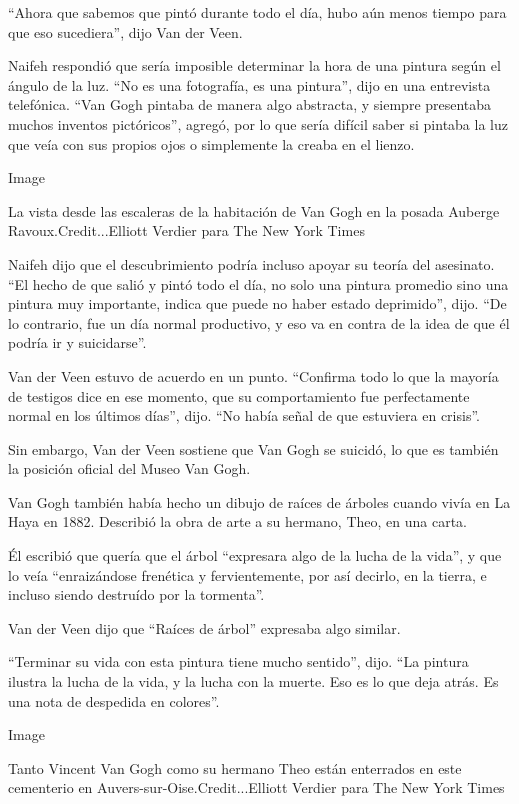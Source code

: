 ``Ahora que sabemos que pintó durante todo el día, hubo aún menos tiempo
para que eso sucediera'', dijo Van der Veen.

Naifeh respondió que sería imposible determinar la hora de una pintura
según el ángulo de la luz. ``No es una fotografía, es una pintura'',
dijo en una entrevista telefónica. ``Van Gogh pintaba de manera algo
abstracta, y siempre presentaba muchos inventos pictóricos'', agregó,
por lo que sería difícil saber si pintaba la luz que veía con sus
propios ojos o simplemente la creaba en el lienzo.

Image

La vista desde las escaleras de la habitación de Van Gogh en la posada
Auberge Ravoux.Credit...Elliott Verdier para The New York Times

Naifeh dijo que el descubrimiento podría incluso apoyar su teoría del
asesinato. ``El hecho de que salió y pintó todo el día, no solo una
pintura promedio sino una pintura muy importante, indica que puede no
haber estado deprimido'', dijo. ``De lo contrario, fue un día normal
productivo, y eso va en contra de la idea de que él podría ir y
suicidarse''.

Van der Veen estuvo de acuerdo en un punto. ``Confirma todo lo que la
mayoría de testigos dice en ese momento, que su comportamiento fue
perfectamente normal en los últimos días'', dijo. ``No había señal de
que estuviera en crisis''.

Sin embargo, Van der Veen sostiene que Van Gogh se suicidó, lo que es
también la posición oficial del Museo Van Gogh.

Van Gogh también había hecho un dibujo de raíces de árboles cuando vivía
en La Haya en 1882. Describió la obra de arte a su hermano, Theo, en una
carta.

Él escribió que quería que el árbol ``expresara algo de la lucha de la
vida'', y que lo veía ``enraizándose frenética y fervientemente, por así
decirlo, en la tierra, e incluso siendo destruído por la tormenta''.

Van der Veen dijo que ``Raíces de árbol'' expresaba algo similar.

``Terminar su vida con esta pintura tiene mucho sentido'', dijo. ``La
pintura ilustra la lucha de la vida, y la lucha con la muerte. Eso es lo
que deja atrás. Es una nota de despedida en colores''.

Image

Tanto Vincent Van Gogh como su hermano Theo están enterrados en este
cementerio en Auvers-sur-Oise.Credit...Elliott Verdier para The New York
Times

